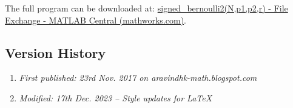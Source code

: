 The full program can be downloaded at: \href{https://www.mathworks.com/matlabcentral/fileexchange/65164-signed_bernoulli2-n-p1-p2-r}{signed\_bernoulli2(N,p1,p2,r) - File Exchange - MATLAB Central (mathworks.com)}.

\subsection{Version History}
\begin{enumerate}
	\item \emph{First published: 23rd Nov. 2017 on aravindhk-math.blogspot.com}
	\item \emph{Modified: 17th Dec. 2023 -- Style updates for \LaTeX}
\end{enumerate}

